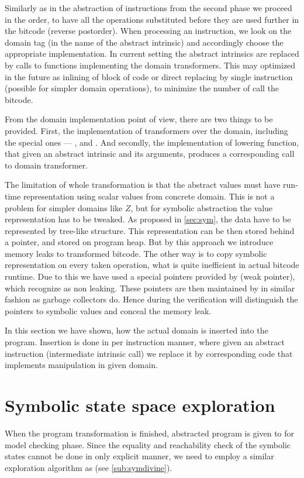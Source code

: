 Similarly as in the abstraction of instructions from the second phase we proceed in
the order, to have all the operations substituted before they are
used further in the bitcode (reverse postorder). When processing an
instruction, we look on the domain tag (in the name of the abstract intrinsic)
and accordingly choose the appropriate implementation. In current setting the
abstract intrinsics are replaced by calls to functions implementing the domain
transformers. This may optimized in the future as inlining of block of code or
direct replacing by single instruction (possible for simpler domain operations),
to minimize the number of call the bitcode.

From the domain implementation point of view, there are two things to be
provided. First, the implementation of transformers over the domain, including
the special ones --- ,  and .
And secondly, the implementation of lowering function, that given an abstract
\LART intrinsic and its arguments, produces a corresponding call to domain
transformer.

The limitation of whole transformation is that the abstract values must have
run-time representation using scalar values from concrete domain. This is not a
problem for simpler domains like $Z$, but for symbolic abstraction the value
representation has to be tweaked. As proposed in \autoref{sec:sym}, the data
have to be represented by tree-like structure. This representation can be then
stored behind a pointer, and stored on program heap. But by this approach we
introduce memory leaks to transformed bitcode. The other way is to copy symbolic
representation on every taken operation, what is quite inefficient in actual
bitcode runtime. Due to this we have used a special pointers provided by
\DIVINE (weak pointer), which \DIVINE recognize as non leaking. These pointers
are then maintained by \DIVM in similar fashion as garbage collectors do.
Hence during the verification \DIVINE will distinguish the pointers to symbolic
values and conceal the memory leak.

\begin{summary}
In this section we have shown, how the actual domain is inserted into the
program. Insertion is done in per instruction manner, where given an abstract
instruction (intermediate intrinsic call) we replace it by corresponding code
that implements manipulation in given domain.
\end{summary}

\section{Symbolic state space exploration} \label{sec:symbolic}
When the program transformation is finished, abstracted program is given to
\DIVINE for model checking phase. Since the equality and reachability check
of the symbolic states cannot be done in only explicit manner, we need to employ
a similar exploration algorithm as \SymDIVINE (see \autoref{sub:symdivine}).


